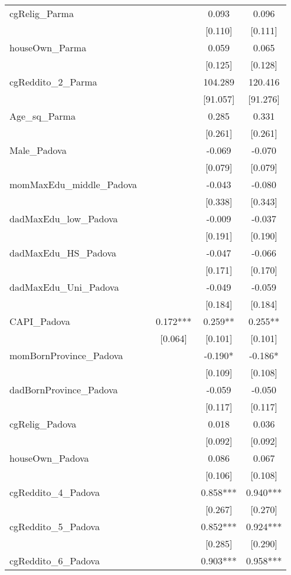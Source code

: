 \documentclass[]{article}
\begin{document}
\begin{tabular}{lcccc}
cgRelig\_Parma &  &  & 0.093 & 0.096 \\
 &  &  & [0.110] & [0.111] \\
houseOwn\_Parma &  &  & 0.059 & 0.065 \\
 &  &  & [0.125] & [0.128] \\
cgReddito\_2\_Parma &  &  & 104.289 & 120.416 \\
 &  &  & [91.057] & [91.276] \\
Age\_sq\_Parma &  &  & 0.285 & 0.331 \\
 &  &  & [0.261] & [0.261] \\
Male\_Padova &  &  & -0.069 & -0.070 \\
 &  &  & [0.079] & [0.079] \\
momMaxEdu\_middle\_Padova &  &  & -0.043 & -0.080 \\
 &  &  & [0.338] & [0.343] \\
dadMaxEdu\_low\_Padova &  &  & -0.009 & -0.037 \\
 &  &  & [0.191] & [0.190] \\
dadMaxEdu\_HS\_Padova &  &  & -0.047 & -0.066 \\
 &  &  & [0.171] & [0.170] \\
dadMaxEdu\_Uni\_Padova &  &  & -0.049 & -0.059 \\
 &  &  & [0.184] & [0.184] \\
CAPI\_Padova &  & 0.172*** & 0.259** & 0.255** \\
 &  & [0.064] & [0.101] & [0.101] \\
momBornProvince\_Padova &  &  & -0.190* & -0.186* \\
 &  &  & [0.109] & [0.108] \\
dadBornProvince\_Padova &  &  & -0.059 & -0.050 \\
 &  &  & [0.117] & [0.117] \\
cgRelig\_Padova &  &  & 0.018 & 0.036 \\
 &  &  & [0.092] & [0.092] \\
houseOwn\_Padova &  &  & 0.086 & 0.067 \\
 &  &  & [0.106] & [0.108] \\
cgReddito\_4\_Padova &  &  & 0.858*** & 0.940*** \\
 &  &  & [0.267] & [0.270] \\
cgReddito\_5\_Padova &  &  & 0.852*** & 0.924*** \\
 &  &  & [0.285] & [0.290] \\
cgReddito\_6\_Padova &  &  & 0.903*** & 0.958*** \\

\end{tabular}
\end{document}
